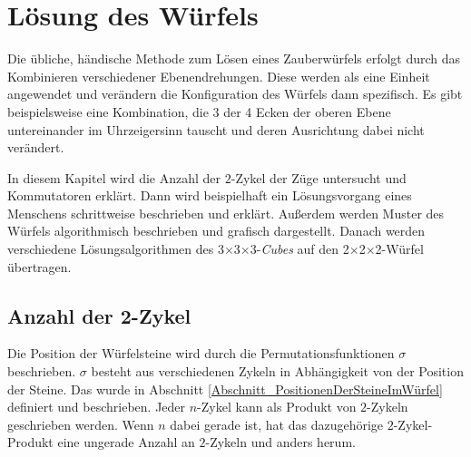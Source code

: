 \documentclass[12pt,a4paper, usenames, dvipsnames]{article}
\theoremstyle{mystyle}
\theoremstyle{definition}
\newcommand{\Ttwo}{2$\times$2$\times$2-}
\newcommand{\Tthree}{3$\times$3$\times$3-}
\begin{document}
\section{Lösung des Würfels}

\label{Kapitel_Lösung}

Die übliche, händische Methode zum Lösen eines Zauberwürfels erfolgt durch das Kombinieren verschiedener Ebenendrehungen. Diese werden als eine Einheit angewendet und verändern die Konfiguration des Würfels dann spezifisch. 
Es gibt beispielsweise eine Kombination, die 3 der 4 Ecken der oberen Ebene untereinander im Uhrzeigersinn tauscht und deren Ausrichtung dabei nicht verändert. 

In diesem Kapitel wird die Anzahl der $2$-Zykel der Züge untersucht und Kommutatoren erklärt.
Dann wird beispielhaft ein Lösungsvorgang eines Menschens schrittweise beschrieben und erklärt.
Außerdem werden Muster des Würfels algorithmisch beschrieben und grafisch dargestellt.
Danach werden verschiedene Lösungsalgorithmen des \Tthree \textit{Cubes} auf den \Ttwo Würfel übertragen.

%
%
%
%
%
%
%
%
%
%
%
%
%
%
%
%
%
%
%
%
\subsection{Anzahl der 2-Zykel}

Die Position der Würfelsteine wird durch die Permutationsfunktionen $\sigma$ beschrieben.  $\sigma$ besteht aus verschiedenen Zykeln in Abhängigkeit von der Position der Steine. Das wurde in Abschnitt \ref{Abschnitt_PositionenDerSteineImWürfel} definiert und beschrieben. Jeder $n$-Zykel kann als Produkt von $2$-Zykeln geschrieben werden. Wenn $n$ dabei gerade ist, hat das dazugehörige $2$-Zykel-Produkt eine ungerade Anzahl an $2$-Zykeln und anders herum. \cite{TD}
\end{document}

